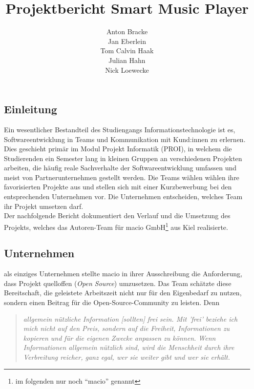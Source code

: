 \documentclass[10pt, a4paper]{article}
\title{Projektbericht Smart Music Player}
\author{Anton Bracke\\Jan Eberlein\\Tom Calvin Haak\\Julian Hahn\\Nick Loewecke}
\begin{document}
\begin{onehalfspace}
\maketitle
\newpage
\tableofcontents
\newpage




\section{Einleitung}
Ein wesentlicher Bestandteil des Studiengangs \glqq Informationstechnologie\grqq{} ist es, Softwareentwicklung in Teams und Kommunikation mit Kund:innen zu erlernen. \cite{Qualifikationsziele_Informationstechnologie}
Dies geschieht primär im Modul \glqq Projekt Informatik (PROI)\grqq{},
 in welchem die Studierenden ein Semester lang in kleinen Gruppen an verschiedenen Projekten arbeiten,
  die häufig reale Sachverhalte der Softwareentwicklung umfassen und meist von Partnerunternehmen gestellt werden.
Die Teams wählen wählen ihre favorisierten Projekte aus und stellen sich mit einer Kurzbewerbung bei den entsprechenden Unternehmen vor.
Die Unternehmen entscheiden, welches Team ihr Projekt umsetzen darf.
\\
Der nachfolgende Bericht dokumentiert den Verlauf und die Umsetzung des Projekts, welches das Autoren-Team für macio GmbH\footnote{im folgenden nur noch \enquote{macio} genannt} aus Kiel realisierte.

\subsection{Unternehmen}
als einziges Unternehmen stellte macio in ihrer Ausschreibung die Anforderung, dass Projekt quelloffen (\textit{Open Source}) umzusetzen.
Das Team schätzte diese Bereitschaft, die geleistete Arbeitszeit nicht nur für den Eigenbedarf zu nutzen, sondern einen Beitrag für die Open-Source-Community zu leisten.
Denn

\begin{quote}
  \textit{allgemein nützliche Information [sollten] frei sein.
  Mit 'frei' beziehe ich mich nicht auf den Preis, sondern auf die Freiheit, Informationen zu kopieren und für die eigenen Zwecke anpassen zu können.
  Wenn Informationen allgemein nützlich sind, wird die Menschheit durch ihre Verbreitung reicher, ganz egal, wer sie weiter gibt und wer sie erhält.}
  \cite{openSource}
\end{quote}


\end{onehalfspace}
\end{document}
